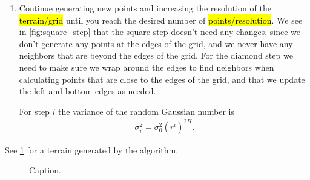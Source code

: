 \begin{enumerate}

    \item Continue generating new points and increasing the resolution of the \hl{terrain/grid} until you reach the desired number of \hl{points/resolution}. We see in \cref{fig:square_step} that the square step doesn't need any changes, since we don't generate any points at the edges of the grid, and we never have any neighbors that are beyond the edges of the grid. For the diamond step we need to make sure we wrap around the edges to find neighbors when calculating points that are close to the edges of the grid, and that we update the left and bottom edges as needed. 
    
    For step $i$ the variance of the random Gaussian number is
    \begin{align*}
        \sigma_i^2 = \sigma_0^2(r^i)^{2H}.
    \end{align*}
\end{enumerate}

See \cref{fig:diamond_square_terrain} for a terrain generated by the algorithm.

\begin{figure}
    \centering
    
    \caption{
        Caption.
        \label{fig:diamond_square_terrain}
    }
\end{figure}


%     

